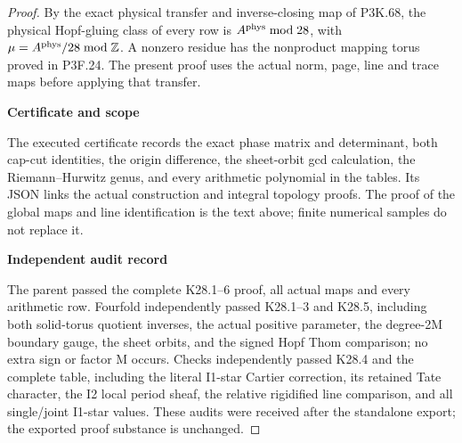 \begin{proof}
By the exact physical transfer and inverse-closing map of P3K.68, the physical Hopf-gluing class of
every row is \(A^{\rm phys}\bmod28\), with
\(\mu=A^{\rm phys}/28\bmod\mathbb Z\). A nonzero residue has the
nonproduct mapping torus proved in P3F.24. The present proof
uses the actual norm, page, line and trace maps before applying
that transfer.

\par

\medskip\noindent\textbf{Certificate and scope}

\par\nobreak

The executed certificate  records
the exact phase matrix and determinant, both cap-cut identities,
the origin difference, the sheet-orbit gcd calculation, the
Riemann--Hurwitz genus, and every arithmetic polynomial in the
tables. Its JSON links the actual construction and integral topology
proofs. The proof of the global maps and line identification is
the text above; finite numerical samples do not replace it.

\par

\medskip\noindent\textbf{Independent audit record}

\par\nobreak

The parent passed the complete K28.1--6 proof, all actual maps and every arithmetic row. Fourfold independently passed K28.1--3 and K28.5, including both solid-torus quotient inverses, the actual positive parameter, the degree-2M boundary gauge, the sheet orbits, and the signed Hopf Thom comparison; no extra sign or factor M occurs. Checks independently passed K28.4 and the complete table, including the literal I1-star Cartier correction, its retained Tate character, the I2 local period sheaf, the relative rigidified line comparison, and all single/joint I1-star values. These audits were received after the standalone export; the exported proof substance is unchanged.
\end{proof}
